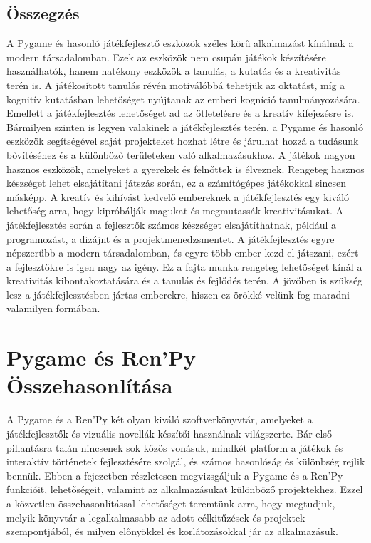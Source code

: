 \subsection{Összegzés}
\indent \indent A Pygame és hasonló játékfejlesztő eszközök széles körű alkalmazást kínálnak a modern társadalomban.
 Ezek az eszközök nem csupán játékok készítésére használhatók, hanem hatékony eszközök a tanulás,
  a kutatás és a kreativitás terén is. A játékosított tanulás révén motiválóbbá tehetjük az oktatást, 
  míg a kognitív kutatásban lehetőséget nyújtanak az emberi kogníció tanulmányozására.
   Emellett a játékfejlesztés lehetőséget ad az ötletelésre és a kreatív kifejezésre is.
    Bármilyen szinten is legyen valakinek a játékfejlesztés terén,
 a Pygame és hasonló eszközök segítségével saját projekteket hozhat létre és járulhat hozzá
  a tudásunk bővítéséhez és a különböző területeken való alkalmazásukhoz.
   A játékok nagyon hasznos eszközök, amelyeket a gyerekek és felnőttek is élveznek.
    Rengeteg hasznos készséget lehet elsajátítani játszás során, ez a számítógépes játékokkal sincsen másképp.
A kreatív és kihívást kedvelő embereknek a játékfejlesztés egy kiváló lehetőség arra,
 hogy kipróbálják magukat és megmutassák kreativitásukat.
  A játékfejlesztés során a fejlesztők számos készséget elsajátíthatnak, például a programozást,
a dizájnt és a projektmenedzsmentet. A játékfejlesztés egyre népszerűbb a modern társadalomban,
 és egyre több ember kezd el játszani, ezért a fejlesztőkre is igen nagy az igény. 
 Ez a fajta munka rengeteg lehetőséget kínál a kreativitás kibontakoztatására és a tanulás és fejlődés terén.
  A jövőben is szükség lesz a játékfejlesztésben jártas emberekre, hiszen ez örökké velünk
   fog maradni valamilyen formában.


\section{Pygame és Ren'Py Összehasonlítása} 
\indent \indent A Pygame és a Ren'Py két olyan kiváló szoftverkönyvtár, amelyeket a játékfejlesztők és vizuális novellák készítői használnak világszerte. Bár első pillantásra talán nincsenek sok közös vonásuk, mindkét platform a játékok és interaktív történetek fejlesztésére szolgál, és számos hasonlóság és különbség rejlik bennük. Ebben a fejezetben részletesen megvizsgáljuk a Pygame és a Ren'Py funkcióit, lehetőségeit, valamint az alkalmazásukat különböző projektekhez. Ezzel a közvetlen összehasonlítással lehetőséget teremtünk arra, hogy megtudjuk, melyik könyvtár a legalkalmasabb az adott célkitűzések és projektek szempontjából, és milyen előnyökkel és korlátozásokkal jár az alkalmazásuk.\cite{pygame-renpy}


